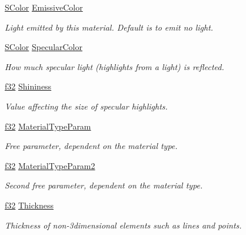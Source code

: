 \begin{DoxyCompactItemize}
\hyperlink{classirr_1_1video_1_1SColor}{S\+Color} \hyperlink{classirr_1_1video_1_1SMaterial_a005f9acf8855681c21b3e3e7de67306f}{Emissive\+Color}
\begin{DoxyCompactList}\small\item\em Light emitted by this material. Default is to emit no light. \end{DoxyCompactList}\item 
\hyperlink{classirr_1_1video_1_1SColor}{S\+Color} \hyperlink{classirr_1_1video_1_1SMaterial_a253c2acbafe6698e3d16b3e3a1e199ed}{Specular\+Color}
\begin{DoxyCompactList}\small\item\em How much specular light (highlights from a light) is reflected. \end{DoxyCompactList}\item 
\hyperlink{namespaceirr_a0277be98d67dc26ff93b1a6a1d086b07}{f32} \hyperlink{classirr_1_1video_1_1SMaterial_a877106a83108db6d1f30a38379d28494}{Shininess}
\begin{DoxyCompactList}\small\item\em Value affecting the size of specular highlights. \end{DoxyCompactList}\item 
\hyperlink{namespaceirr_a0277be98d67dc26ff93b1a6a1d086b07}{f32} \hyperlink{classirr_1_1video_1_1SMaterial_aefe0acce491efa8dedcd2b7cb49f8133}{Material\+Type\+Param}
\begin{DoxyCompactList}\small\item\em Free parameter, dependent on the material type. \end{DoxyCompactList}\item 
\hyperlink{namespaceirr_a0277be98d67dc26ff93b1a6a1d086b07}{f32} \hyperlink{classirr_1_1video_1_1SMaterial_a3c4af8e0325a95ff78c3066a497161de}{Material\+Type\+Param2}
\begin{DoxyCompactList}\small\item\em Second free parameter, dependent on the material type. \end{DoxyCompactList}\item 
\mbox{\label{classirr_1_1video_1_1SMaterial_a5b147b8e6fa53c54d3f33e44982220a1}} 
\hyperlink{namespaceirr_a0277be98d67dc26ff93b1a6a1d086b07}{f32} \hyperlink{classirr_1_1video_1_1SMaterial_a5b147b8e6fa53c54d3f33e44982220a1}{Thickness}
\begin{DoxyCompactList}\small\item\em Thickness of non-\/3dimensional elements such as lines and points. \end{DoxyCompactList}\item 

\end{DoxyCompactItemize}
